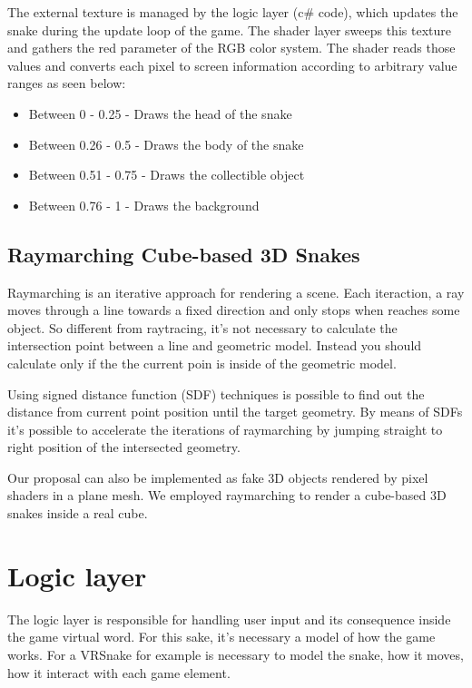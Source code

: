 \documentclass[runningheads]{llncs}
\begin{document}
The external texture is managed by the logic layer (c\# code), which updates the snake during the update loop of the game. The shader layer sweeps this texture and gathers the red parameter of the RGB color system. The shader reads those values and converts each pixel to screen information according to arbitrary value ranges as seen below:

\begin{itemize}
  \item Between 0 - 0.25 - Draws the head of the snake
  \item Between 0.26 - 0.5 - Draws the body of the snake
  \item Between 0.51 - 0.75 - Draws the collectible object
  \item Between 0.76 - 1 - Draws the background
\end{itemize}

\subsection{Raymarching Cube-based 3D Snakes}
\label{subsec:raymarching-snakes}
Raymarching is an iterative approach for rendering a scene. Each iteraction, a ray moves through a line towards a fixed direction and only stops when reaches some object. So different from raytracing, it's not necessary to calculate the intersection point between a line and geometric model. Instead you should calculate only if the the current poin is inside of the geometric model.

Using signed distance function (SDF) techniques \cite{hart1996sphere} is possible to find out the distance from current point position until the target geometry. By means of SDFs it's possible to accelerate the iterations of raymarching by jumping straight to right position of the intersected geometry.

Our proposal can also be implemented as fake 3D objects rendered by pixel shaders in a plane mesh. We employed raymarching to render a cube-based 3D snakes inside a real cube.

\section{Logic layer}

The logic layer is responsible for handling user input and its consequence inside the game virtual word. For this sake, it's necessary a model of how the game works. For a VRSnake for example is necessary to model the snake, how it moves, how it interact with each game element.
\end{document}
